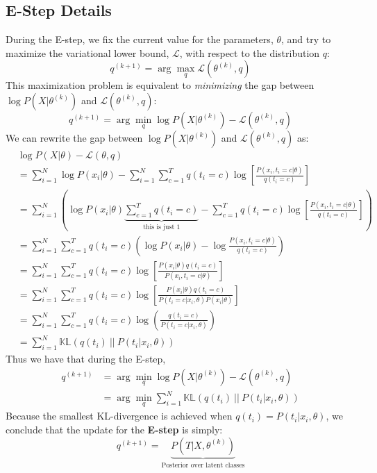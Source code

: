 \documentclass[11pt]{article}
\begin{document}
\subsection*{E-Step Details}
During the E-step, we fix the current value for the parameters, $\theta$, and
try to maximize the variational lower bound, $\mathcal{L}$, with respect to the
distribution $q$:
\begin{equation*}
    q^{(k+1)} = \arg \max_q \mathcal{L}(\theta^{(k)}, q)
\end{equation*}
This maximization problem is equivalent to \emph{minimizing} the gap between $\log
P(X|\theta^{(k)})$ and $\mathcal{L}(\theta^{(k)}, q)$:
\begin{equation*}
    q^{(k+1)} = \arg \min_q \log P(X|\theta^{(k)}) - \mathcal{L}(\theta^{(k)},
    q)
\end{equation*}
We can rewrite the gap between $\log P(X|\theta^{(k)})$ and
$\mathcal{L}(\theta^{(k)}, q)$ as:
\begin{align*}
    &\log P(X|\theta) - \mathcal{L}(\theta, q)\\
    &= \sum_{i=1}^N \log P(x_i|\theta)  - \sum_{i=1}^N
    \sum_{c=1}^T q(t_i = c) \log \left[ \frac{P(x_i, t_i = c |
    \theta)}{q(t_i=c)} \right]\\
    &= \sum_{i=1}^N \left( \log P(x_i | \theta) \underbrace{\sum_{c=1}^T q(t_i =
    c)}_{\text{this is just 1}} - \sum_{c=1}^T q(t_i = c) \log \left[ \frac{P(x_i,
    t_i = c | \theta)}{q(t_i = c)} \right] \right)\\
    &= \sum_{i=1}^N \sum_{c=1}^T q(t_i = c) \left( \log P(x_i | \theta) - \log
    \frac{P(x_i, t_i = c | \theta)}{q(t_i = c)} \right)\\
    &= \sum_{i=1}^N \sum_{c=1}^T q(t_i = c) \log \left[ \frac{P(x_i | \theta)
    q(t_i = c)}{P(x_i, t_i = c | \theta) } \right]\\
    &= \sum_{i=1}^N \sum_{c=1}^T q(t_i = c) \log \left[ \frac{P(x_i | \theta)
    q(t_i = c)}{P(t_i = c | x_i, \theta)  P(x_i | \theta)} \right]\\
    &= \sum_{i=1}^N \sum_{c=1}^T q(t_i=c) \log \left( \frac{q(t_i =
    c)}{P(t_i=c|x_i, \theta)} \right) \\
    &= \sum_{i=1}^N \mathbb{KL}(q(t_i) \ || \ P(t_i| x_i, \theta))
\end{align*}
Thus we have that during the E-step, 
\begin{align*}
    q^{(k+1)} &= \arg \min_q \log P(X|\theta^{(k)}) - \mathcal{L}(\theta^{(k)},
    q)\\
    &= \arg \min_q \sum_{i=1}^N \mathbb{KL}(q(t_i) \ || \ P(t_i| x_i, \theta))
\end{align*}
Because the smallest KL-divergence is achieved when $q(t_i) = P(t_i| x_i,
\theta)$, we conclude that the update for the \textbf{E-step} is simply:
\begin{equation}
    q^{(k+1)} = \underbrace{P(T | X, \theta^{(k)})}_{\text{Posterior over
    latent classes}}
\end{equation}
\end{document}
